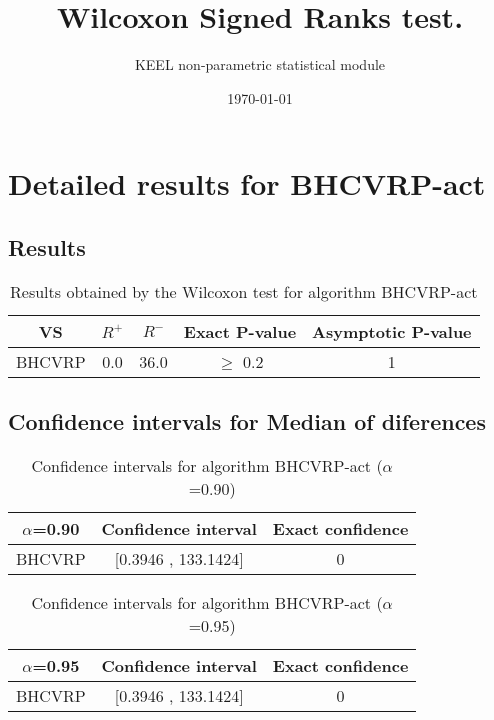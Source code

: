 \documentclass[a4paper,10pt]{article}
\title{Wilcoxon Signed Ranks test.}
\date{\today}
\author{KEEL non-parametric statistical module}
\begin{document}
\pagestyle{empty}
\maketitle
\thispagestyle{empty}



\section{Detailed results for BHCVRP-act}


\subsection{Results}

\begin{table}[!htp]
\centering\small
\begin{tabular}{
|c|c|c|c|c|}
\hline
 VS & $R^{+}$ & $R^{-}$ & Exact P-value & Asymptotic P-value \\ \hline 
BHCVRP & 0.0 & 36.0 & $\geq$ 0.2 & 1\\ \hline 

\end{tabular}
\caption{Results obtained by the Wilcoxon test for algorithm BHCVRP-act}
\end{table}

\subsection{Confidence intervals for Median of diferences}

\begin{table}[!htp]
\centering\small
\begin{tabular}{
|c|c|c|}
\hline
 $\alpha$=0.90 & Confidence interval & Exact confidence \\ \hline 
BHCVRP & [0.3946 , 133.1424] & 0\\ \hline 

\end{tabular}
\caption{Confidence intervals for algorithm BHCVRP-act ($\alpha$=0.90)}
\end{table}
\begin{table}[!htp]
\centering\small
\begin{tabular}{
|c|c|c|}
\hline
 $\alpha$=0.95 & Confidence interval & Exact confidence \\ \hline 
BHCVRP & [0.3946 , 133.1424] & 0\\ \hline 

\end{tabular}
\caption{Confidence intervals for algorithm BHCVRP-act ($\alpha$=0.95)}
\end{table}
\end{document}
